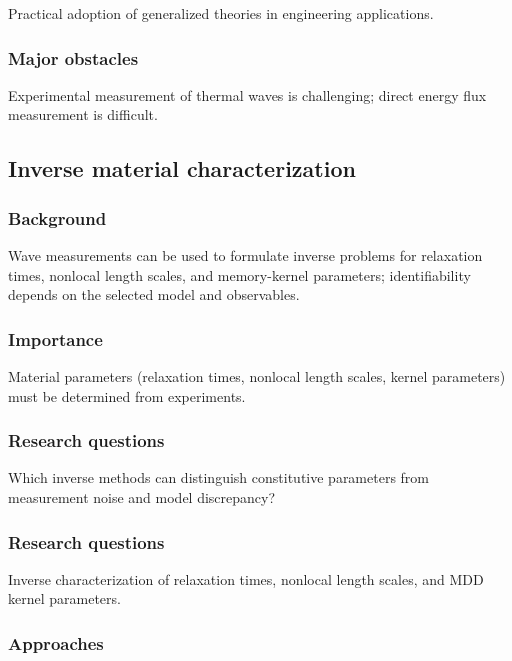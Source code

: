 Practical adoption of generalized theories in engineering applications.

\subsubsection{Major obstacles}

Experimental measurement of thermal waves is challenging; direct energy flux measurement is difficult.

\subsection{Inverse material characterization}
\label{sec:inverse-characterization}

\subsubsection{Background}

Wave measurements can be used to formulate inverse problems for relaxation times, nonlocal length scales, and memory-kernel parameters; identifiability depends on the selected model and observables.

\subsubsection{Importance}

Material parameters (relaxation times, nonlocal length scales, kernel parameters) must be determined from experiments.

\subsubsection{Research questions}

Which inverse methods can distinguish constitutive parameters from measurement noise and model discrepancy?

\subsubsection{Research questions}

Inverse characterization of relaxation times, nonlocal length scales, and MDD kernel parameters.

\subsubsection{Approaches}

